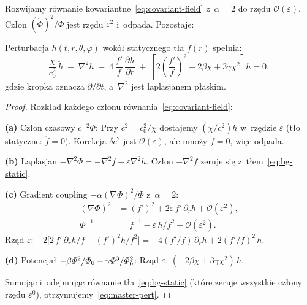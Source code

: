 Rozwijamy r\'ownanie kowariantne~\eqref{eq:covariant-field}
z~$\alpha = 2$ do rz\k{e}du $\mathcal{O}(\varepsilon)$.
Cz\l{}on $(\dot\Phi)^2/\Phi$ jest rz\k{e}du $\varepsilon^2$
i~odpada. Pozostaje:

\begin{proposition}\label{prop:master-pert}
Perturbacja $h(t,r,\theta,\varphi)$ wok\'o\l{} statycznego t\l{}a
$f(r)$ spe\l{}nia:
\begin{equation}\label{eq:master-pert}
  \frac{\chi}{c_0^2}\,\ddot{h}
  \;-\; \nabla^2 h
  \;-\; 4\,\frac{f'}{f}\,\frac{\partial h}{\partial r}
  \;+\; \left[2\!\left(\frac{f'}{f}\right)^{\!2}
    - 2\beta\chi + 3\gamma\chi^2
  \right] h = 0,
\end{equation}
gdzie kropka oznacza $\partial/\partial t$,
a~$\nabla^2$ jest laplasjanem p\l{}askim.
\end{proposition}

\begin{proof}
Rozk\l{}ad ka\.zdego cz\l{}onu r\'ownania~\eqref{eq:covariant-field}:

\smallskip\noindent
\textbf{(a)} Cz\l{}on czasowy $c^{-2}\ddot\Phi$:
Przy $c^2 = c_0^2/\chi$ dostajemy $(\chi/c_0^2)\ddot h$
w~rz\k{e}dzie $\varepsilon$ (t\l{}o statyczne: $\ddot f = 0$).
Korekcja $\delta c^2$ jest $\mathcal{O}(\varepsilon)$,
ale mno\.zy $\ddot f = 0$, wi\k{e}c odpada.

\smallskip\noindent
\textbf{(b)} Laplasjan $-\nabla^2\Phi = -\nabla^2 f - \varepsilon\nabla^2 h$.
Cz\l{}on $-\nabla^2 f$ zeruje si\k{e} z~t\l{}em~\eqref{eq:bg-static}.

\smallskip\noindent
\textbf{(c)} Gradient coupling $-\alpha(\nabla\Phi)^2/\Phi$
z~$\alpha = 2$:
\begin{align*}
  (\nabla\Phi)^2 &= (f')^2 + 2\varepsilon\,f'\,\partial_r h
    + \mathcal{O}(\varepsilon^2), \\
  \Phi^{-1} &= f^{-1} - \varepsilon\,h/f^2
    + \mathcal{O}(\varepsilon^2).
\end{align*}
Rz\k{a}d $\varepsilon$:
$-2\bigl[2\,f'\,\partial_r h / f - (f')^2 h / f^2\bigr]
= -4(f'/f)\,\partial_r h + 2(f'/f)^2\,h$.

\smallskip\noindent
\textbf{(d)} Potencja\l{} $-\beta\varPhi^2/\varPhi_0 + \gamma\varPhi^3/\varPhi_0^2$:
Rz\k{a}d $\varepsilon$: $(-2\beta\chi + 3\gamma\chi^2)\,h$.

Sumuj\k{a}c i~odejmuj\k{a}c r\'ownanie t\l{}a~\eqref{eq:bg-static}
(kt\'ore zeruje wszystkie cz\l{}ony rz\k{e}du $\varepsilon^0$),
otrzymujemy~\eqref{eq:master-pert}.
\end{proof}

